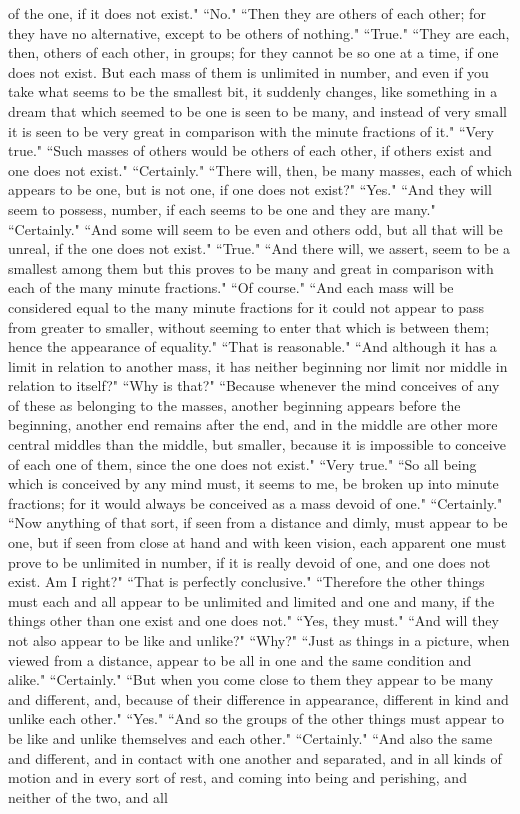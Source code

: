 \documentclass[letterpaper,12pt]{article}
\newcommand{\stephpag}[1]{\marginnote{\small\itshape\fontfamily{ppl}\selectfont #1}}
\begin{document}
of the one, if it does not exist." ``No." ``Then they are others of each other; for they have no alternative, except to be others of nothing." ``True." ``They are each, then, others of each other, in groups; for they cannot be so one at a time, if one does not exist. \stephpag{d} But each mass of them is unlimited in number, and even if you take what seems to be the smallest bit, it suddenly changes, like something in a dream that which seemed to be one is seen to be many, and instead of very small it is seen to be very great in comparison with the minute fractions of it." ``Very true." ``Such masses of others would be others of each other, if others exist and one does not exist." ``Certainly." ``There will, then, be many masses, each of which appears to be one, but is not one, if one does not exist?" ``Yes." \stephpag{e} ``And they will seem to possess, number, if each seems to be one and they are many." ``Certainly." ``And some will seem to be even and others odd, but all that will be unreal, if the one does not exist." ``True." ``And there will, we assert, seem to be a smallest among them but this proves to be many and great in comparison with each of the many minute fractions." \stephpag{165 a} ``Of course." ``And each mass will be considered equal to the many minute fractions for it could not appear to pass from greater to smaller, without seeming to enter that which is between them; hence the appearance of equality." ``That is reasonable." ``And although it has a limit in relation to another mass, it has neither beginning nor limit nor middle in relation to itself?" ``Why is that?" ``Because whenever the mind conceives of any of these as belonging to the masses, another beginning appears before the beginning, \stephpag{b} another end remains after the end, and in the middle are other more central middles than the middle, but smaller, because it is impossible to conceive of each one of them, since the one does not exist." ``Very true." ``So all being which is conceived by any mind must, it seems to me, be broken up into minute fractions; for it would always be conceived as a mass devoid of one." ``Certainly." ``Now anything of that sort, if seen from a distance and dimly, must appear to be one, \stephpag{c} but if seen from close at hand and with keen vision, each apparent one must prove to be unlimited in number, if it is really devoid of one, and one does not exist. Am I right?" ``That is perfectly conclusive." ``Therefore the other things must each and all appear to be unlimited and limited and one and many, if the things other than one exist and one does not." ``Yes, they must." ``And will they not also appear to be like and unlike?" ``Why?" ``Just as things in a picture, when viewed from a distance, appear to be all in one and the same condition and alike." \stephpag{d} ``Certainly." ``But when you come close to them they appear to be many and different, and, because of their difference in appearance, different in kind and unlike each other." ``Yes." ``And so the groups of the other things must appear to be like and unlike themselves and each other." ``Certainly." ``And also the same and different, and in contact with one another and separated, and in all kinds of motion and in every sort of rest, and coming into being and perishing, and neither of the two, and all 
\end{document}
